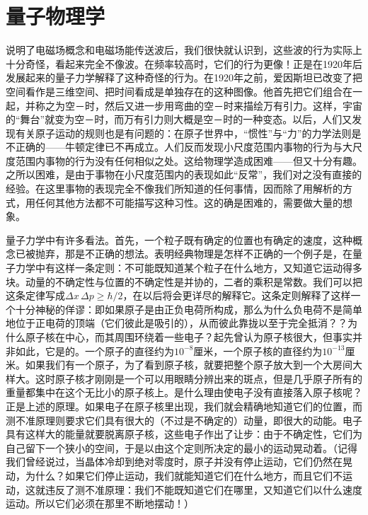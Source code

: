 \section{量子物理学}

说明了电磁场概念和电磁场能传送波后，我们很快就认识到，这些波的行为实际上十分奇怪，看起来完全不像波。在频率较高时，它们的行为更像！正是在1920年后发展起来的量子力学解释了这种奇怪的行为。在1920年之前，爱因斯坦已改变了把空间看作是三维空间、把时间看成是单独存在的这种图像。他首先把它们组合在一起，并称之为空－时，然后又进一步用弯曲的空－时来描绘万有引力。这样，宇宙的“舞台”就变为空－时，而万有引力则大概是空－时的一种变态。以后，人们又发现有关原子运动的规则也是有问题的：在原子世界中，“惯性”与“力”的力学法则是不正确的——牛顿定律已不再成立。人们反而发现小尺度范围内事物的行为与大尺度范围内事物的行为没有任何相似之处。这给物理学造成困难——但又十分有趣。之所以困难，是由于事物在小尺度范围内的表现如此“反常”，我们对之没有直接的经验。在这里事物的表现完全不像我们所知道的任何事情，因而除了用解析的方式，用任何其他方法都不可能描写这种习性。这的确是困难的，需要做大量的想象。

量子力学中有许多看法。首先，一个粒子既有确定的位置也有确定的速度，这种概念已被抛弃，那是不正确的想法。表明经典物理是怎样不正确的一个例子是，在量子力学中有这样一条定则：不可能既知道某个粒子在什么地方，又知道它运动得多块。动量的不确定性与位置的不确定性是并协的，二者的乘积是常数。我们可以把这条定律写成$ \Delta x\,\Delta p\geq\hbar/2 $，在以后将会更详尽的解释它。这条定则解释了这样一个十分神秘的佯谬：即如果原子是由正负电荷所构成，那么为什么负电荷不是简单地位于正电荷的顶端（它们彼此是吸引的），从而彼此靠拢以至于完全抵消？？为什么原子核在中心，而其周围环绕着一些电子？起先曾认为原子核很大，但事实并非如此，它是的。一个原子的直径约为$ 10^{-8} $厘米，一个原子核的直径约为$ 10^{-13} $厘米。如果我们有一个原子，为了看到原子核，就要把整个原子放大到一个大房间大样大。这时原子核才刚刚是一个可以用眼睛分辨出来的斑点，但是几乎原子所有的重量都集中在这个无比小的原子核上。是什么理由使电子没有直接落入原子核呢？正是上述的原理。如果电子在原子核里出现，我们就会精确地知道它们的位置，而测不准原理则要求它们具有很大的（不过是不确定的）动量，即很大的动能。电子具有这样大的能量就要脱离原子核，这些电子作出了让步：由于不确定性，它们为自己留下一个狭小的空间，于是以由这个定则所决定的最小的运动晃动着。（记得我们曾经说过，当晶体冷却到绝对零度时，原子并没有停止运动，它们仍然在晃动，为什么？如果它们停止运动，我们就能知道它们在什么地方，而且它们不运动，这就违反了测不准原理：我们不能既知道它们在哪里，又知道它们以什么速度运动。所以它们必须在那里不断地摆动！）

